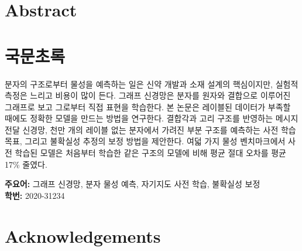 \documentclass[11pt,twoside,openany]{report}
\begin{document}
\chapter*{Abstract}

\clearpage
\tableofcontents
\listoffigures
\listoftables
\clearpage
{}









\appendix


\chapter*{국문초록}
분자의 구조로부터 물성을 예측하는 일은 신약 개발과 소재 설계의 핵심이지만, 실험적 측정은
느리고 비용이 많이 든다. 그래프 신경망은 분자를 원자와 결합으로 이루어진 그래프로 보고 그로부터
직접 표현을 학습한다. 본 논문은 레이블된 데이터가 부족할 때에도 정확한 모델을 만드는 방법을
연구한다. 결합각과 고리 구조를 반영하는 메시지 전달 신경망, 천만 개의 레이블 없는 분자에서
가려진 부분 구조를 예측하는 사전 학습 목표, 그리고 불확실성 추정의 보정 방법을 제안한다.
여덟 가지 물성 벤치마크에서 사전 학습된 모델은 처음부터 학습한 같은 구조의 모델에 비해 평균
절대 오차를 평균 17\% 줄였다.

\medskip\noindent\textbf{주요어:} 그래프 신경망, 분자 물성 예측, 자기지도 사전 학습, 불확실성 보정\\
\textbf{학번:} 2020-31234
\clearpage
\chapter*{Acknowledgements}

\end{document}
